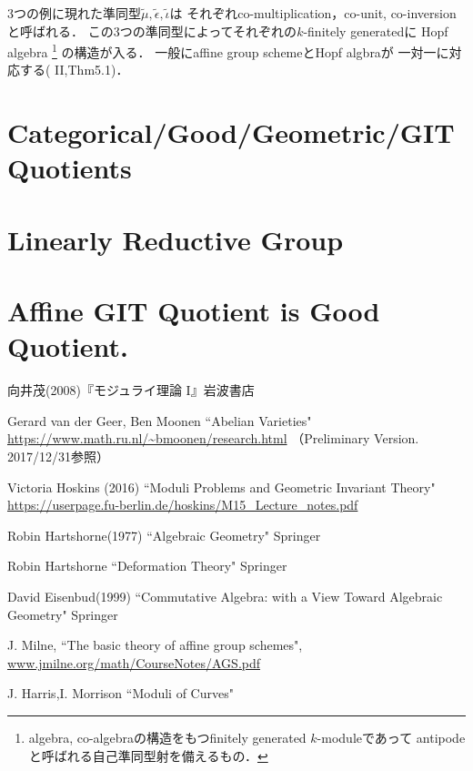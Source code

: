 \documentclass[a4paper]{jsarticle}
\begin{document}
    3つの例に現れた準同型$\tilde{\mu},\tilde{\epsilon},\tilde{\iota}$は
    それぞれco-multiplication，co-unit, co-inversionと呼ばれる．
    この3つの準同型によってそれぞれの$k$-finitely generatedに
    Hopf algebra
    \footnote
    {
        algebra, co-algebraの構造をもつfinitely generated $k$-moduleであって
        antipodeと呼ばれる自己準同型射を備えるもの．
    }
    の構造が入る．
    一般にaffine group schemeとHopf algbraが
    一対一に対応する(\cite{MilneAGS} II,Thm5.1)．


\section{Categorical/Good/Geometric/GIT Quotients}

\section{Linearly Reductive Group}

\section{Affine GIT Quotient is Good Quotient.}

\begin{thebibliography}{99}
        向井茂(2008)『モジュライ理論 I』岩波書店

        Gerard van der Geer, Ben Moonen
        ``Abelian Varieties"
        \url{https://www.math.ru.nl/~bmoonen/research.html}
        （Preliminary Version. 2017/12/31参照）

    Victoria Hoskins (2016)
    ``Moduli Problems and Geometric Invariant Theory"
    \url{https://userpage.fu-berlin.de/hoskins/M15_Lecture_notes.pdf}

    Robin Hartshorne(1977)
    ``Algebraic Geometry"
    Springer

    Robin Hartshorne
    ``Deformation Theory"
    Springer

    David Eisenbud(1999)
    ``Commutative Algebra: with a View Toward Algebraic Geometry"
    Springer
    
    J. Milne, ``The basic theory of affine group schemes", 
    \url{www.jmilne.org/math/CourseNotes/AGS.pdf}

    J. Harris,I. Morrison ``Moduli of Curves"

\end{thebibliography}
\end{document}
